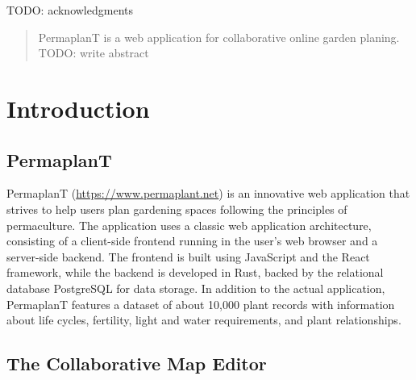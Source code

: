 \documentclass[final,draft,oneside]{vutinfth}
\begin{document}
\frontmatter

\addstatementpage

\begin{acknowledgements*}

TODO: acknowledgments

\end{acknowledgements*}

\begin{abstract}
    PermaplanT is a web application for collaborative online garden planing. TODO: write abstract
\end{abstract}



\tableofcontents %

\mainmatter

\chapter{Introduction}

\section{PermaplanT}

PermaplanT (\url{https://www.permaplant.net}) is an innovative web application that strives to help users plan gardening spaces following the principles of permaculture.
The application uses a classic web application architecture, consisting of a client-side frontend running in the user's web browser and a server-side backend.
The frontend is built using JavaScript and the React framework, while the backend is developed in Rust, backed by the relational database PostgreSQL for data storage.
In addition to the actual application, PermaplanT features a dataset of about 10,000 plant records with information about life cycles, fertility, light and water requirements, and plant relationships.

\section{The Collaborative Map Editor}
\end{document}
